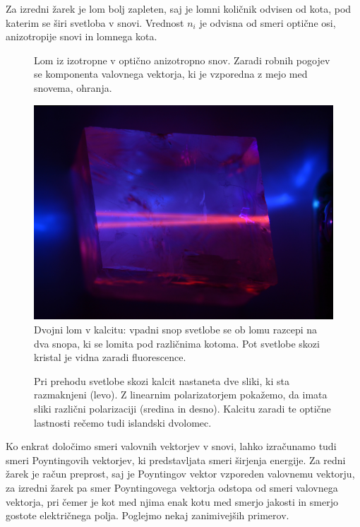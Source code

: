 Za izredni žarek je lom bolj zapleten, saj je lomni količnik odvisen od kota, pod
katerim se širi svetloba v snovi. 
Vrednost $n_i$ je odvisna od smeri optične osi, anizotropije snovi in lomnega kota.
\begin{figure}[h]
\centering
\def\svgwidth{70truemm} 

\caption{Lom iz izotropne v optično anizotropno snov. Zaradi robnih pogojev se
komponenta valovnega vektorja, ki je vzporedna z mejo med snovema, ohranja. }
\label{fig:10_dvolom_1}
\end{figure}
\begin{figure}[ht]
\centering
\includegraphics[width=9truecm]{slike/10_FotoDvolom2.jpg}
\caption{Dvojni lom v kalcitu: vpadni snop svetlobe se ob lomu 
razcepi na dva snopa, ki se lomita pod različnima kotoma.
Pot svetlobe skozi kristal je vidna zaradi fluorescence.}
\label{fig:10_dvolom_2}
\end{figure}
\begin{figure}[h!]
\centering
\def\svgwidth{140truemm} 

\caption{Pri prehodu svetlobe skozi kalcit nastaneta dve sliki, ki sta razmaknjeni (levo). 
Z linearnim polarizatorjem pokažemo, da imata sliki različni polarizaciji (sredina in desno). 
Kalcitu zaradi te optične lastnosti rečemo tudi islandski dvolomec.
}
\label{fig:10_dvolom_2a}
\end{figure}

Ko enkrat določimo smeri valovnih vektorjev v snovi, lahko izračunamo tudi 
smeri Poyntingovih vektorjev, ki predstavljata smeri širjenja energije. Za redni 
žarek je račun preprost, saj je Poyntingov vektor vzporeden valovnemu vektorju, za 
izredni žarek pa smer Poyntingovega vektorja odstopa od smeri valovnega vektorja, pri 
čemer je kot med njima enak kotu med smerjo jakosti in smerjo gostote električnega polja. 
Poglejmo nekaj zanimivejših primerov.

